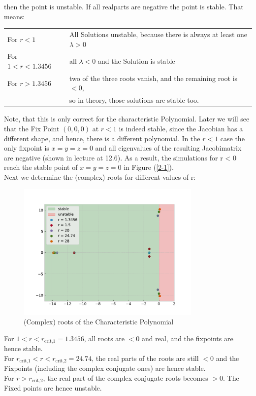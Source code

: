 \documentclass{article}
\begin{document}
then the point is unstable. If all realparts are negative the point is stable.
That means:
\begin{table}[H]
    \centering
    \begin{tabular}{ll}
    For $ r < 1 $ & All Solutions unstable, because there is always at least
    one \( \lambda > 0 \) \\ 
    For $ 1 < r < 1.3456 $ & all \( \lambda < 0 \) and the Solution is stable \\
    For $ r > 1.3456 $ & two of the three roots vanish, and the remaining root
    is $ < 0 $, \\ & so in theory, those solutions are stable too.
    \end{tabular}
\end{table}
Note, that this is only correct for the characteristic Polynomial. Later we will
see that the Fix Point \( (0,0,0) \) at \( r < 1 \) is indeed stable, since
the Jacobian has a different shape, and hence, there is a different polynomial.
In the \( r < 1 \)  case the only fixpoint is $x=y=z=0$ and all eigenvalues of
the resulting Jacobimatrix are negative (shown in
lecture at 12.6). As a result, the simulations for r < 0 reach the
stable point of $x=y=z=0$ in Figure (\ref{2-1}). \\[.5cm]

Next we determine the (complex) roots for different values of r:
\begin{figure}[H]
    \centering
    \includegraphics[width=9cm]{Figure1-2.pdf} 
    \caption{(Complex) roots of the Characteristic Polynomial} 
\end{figure}
For \( 1 < r < r_\text{crit,1} = 1.3456 \), all roots are \( < 0 \) and real,
and the fixpoints are hence stable.\\
For \(  r_\text{crit,1} < r < r_\text{crit,2} = 24.74\), the real parts of the
roots are still \( < 0 \) and the Fixpoints (including the complex
conjugate ones) are hence stable. \\
For \( r > r_\text{crit,2} \), the real part of the complex conjugate roots
becomes \( > 0 \). The Fixed points are hence unstable. \\
\end{document}
